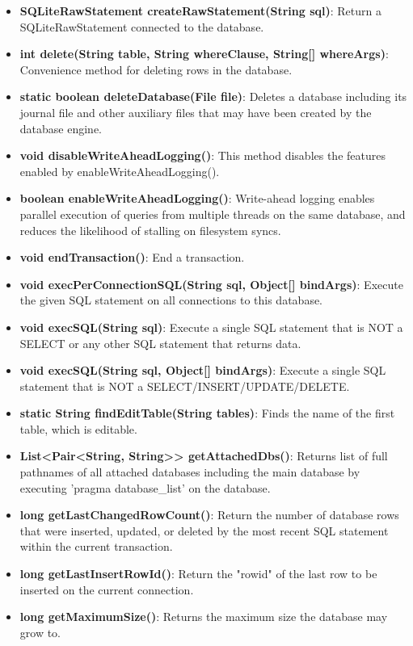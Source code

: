 \documentclass{report}
\begin{document}
\begin{itemize}
\begin{itemize}
\begin{itemize}
                \item \textbf{SQLiteRawStatement	createRawStatement(String sql)}: Return a SQLiteRawStatement connected to the database.
                \item \textbf{int	delete(String table, String whereClause, String[] whereArgs)}: Convenience method for deleting rows in the database.
                \item \textbf{static boolean	deleteDatabase(File file)}: Deletes a database including its journal file and other auxiliary files that may have been created by the database engine.
                \item \textbf{void	disableWriteAheadLogging()}: This method disables the features enabled by enableWriteAheadLogging().
                \item \textbf{boolean	enableWriteAheadLogging()}: Write-ahead logging enables parallel execution of queries from multiple threads on the same database, and reduces the likelihood of stalling on filesystem syncs.
                \item \textbf{void	endTransaction()}: End a transaction.
                \item \textbf{void	execPerConnectionSQL(String sql, Object[] bindArgs)}: Execute the given SQL statement on all connections to this database.
                \item \textbf{void	execSQL(String sql)}: Execute a single SQL statement that is NOT a SELECT or any other SQL statement that returns data.
                \item \textbf{void	execSQL(String sql, Object[] bindArgs)}: Execute a single SQL statement that is NOT a SELECT/INSERT/UPDATE/DELETE.
                \item \textbf{static String	findEditTable(String tables)}: Finds the name of the first table, which is editable.
                \item \textbf{List<Pair<String, String>>	getAttachedDbs()}: Returns list of full pathnames of all attached databases including the main database by executing 'pragma database\_list' on the database.
                \item \textbf{long	getLastChangedRowCount()}: Return the number of database rows that were inserted, updated, or deleted by the most recent SQL statement within the current transaction.
                \item \textbf{long	getLastInsertRowId()}: Return the "rowid" of the last row to be inserted on the current connection.
                \item \textbf{long	getMaximumSize()}: Returns the maximum size the database may grow to.

\end{itemize}
\end{itemize}
\end{itemize}
\end{document}
